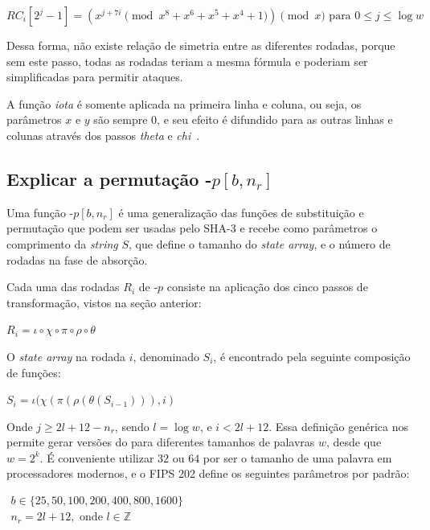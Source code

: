 $RC_{i}[2^{j}-1] = (x^{j+7i} \pmod{x^8 + x^6 + x^5 + x^4 + 1}) \pmod{x} \mbox{ para } 0 \leq j \leq \log w$

Dessa forma, não existe relação de simetria entre as diferentes rodadas, porque
sem este passo, todas as rodadas teriam a mesma fórmula e poderiam ser
simplificadas para permitir ataques.

A função \textit{iota} é somente aplicada na primeira linha e coluna, ou seja,
os parâmetros $x$ e $y$ são sempre 0, e seu efeito é difundido para as outras
linhas e colunas através dos passos \textit{theta} e
\textit{chi}~\cite{keccak:2011}.

\subsection{Explicar a permutação \Keccak-$p[b,n_r]$}

Uma função \Keccak-$p[b, n_r]$ é uma generalização das funções de substituição
e permutação \Keccak{} que podem ser usadas pelo SHA-3 e recebe como parâmetros o
comprimento da \textit{string} $S$, que define o tamanho do
\textit{state array}, e o número de rodadas na fase de absorção.

Cada uma das rodadas $R_{i}$ de \Keccak-$p$ consiste na aplicação dos cinco
passos de transformação, vistos na seção anterior:

\begin{center}
    $R_{i} = \iota \circ \chi \circ \pi \circ \rho \circ \theta$
\end{center}

O \textit{state array} na rodada $i$, denominado $S_{i}$, é encontrado pela
seguinte composição de funções:

\begin{center}
    $S_{i} = \iota(\chi(\pi(\rho(\theta(S_{i-1}))), i)$
\end{center}

Onde $j \geq 2l + 12 - n_r$, sendo $l = \log w$, e $i < 2l + 12$. Essa
definição genérica nos permite gerar versões do \Keccak{} para diferentes
tamanhos de palavras $w$, desde que $w = 2^{k}$. É conveniente utilizar $32$ ou
$64$ por ser o tamanho de uma palavra em processadores modernos, e o FIPS 202
define os seguintes parâmetros por padrão:

$\begin{array}{l}
    b \in \{25, 50, 100, 200, 400, 800, 1600\} \\
    n_{r} = 2l + 12, \mbox{ onde } l \in \mathbb{Z}
\end{array}$

